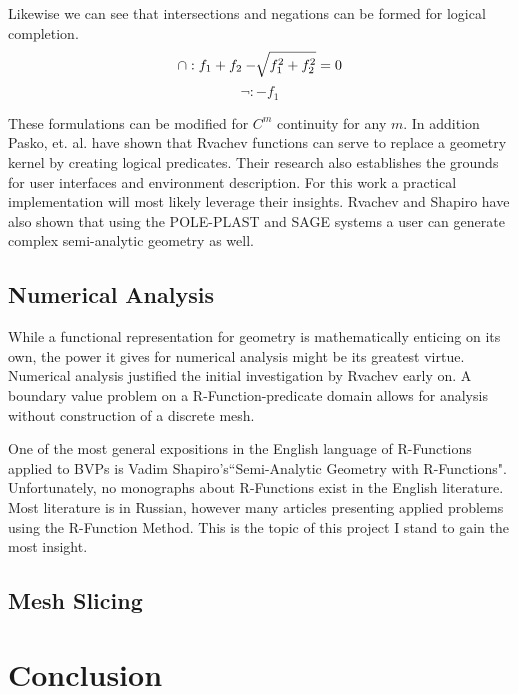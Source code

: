 \documentclass[a4paper]{article}
\begin{document}
Likewise we can see that intersections and negations can be formed for logical
completion.
\begin{equation*}
\cap : f_1 + f_2 - \sqrt[]{f_1^2 +f_2^2} =0 \\
\end{equation*}
\begin{equation*}
\neg : -f_1
\end{equation*}

These formulations can be modified for $C^m$ continuity for any $m$.
\cite{shapiro2007semi} In addition Pasko, et. al. have shown that Rvachev
functions can serve to replace a geometry kernel by creating logical
predicates. \cite{pasko1995function} Their research also establishes the
grounds for user interfaces and environment description. For this work a
practical implementation will most likely leverage their insights.
Rvachev and Shapiro have also shown that using the POLE-PLAST and SAGE
systems a user can generate complex semi-analytic geometry
as well.\cite{rvachev2000completeness} 
\subsection{Numerical Analysis}
While a functional representation for geometry is mathematically enticing on
its own, the power it gives for numerical analysis might be its greatest
virtue. Numerical analysis justified the initial investigation by Rvachev
early on. A boundary value problem on a R-Function-predicate domain allows
for analysis without construction of a discrete mesh.\cite{rvachev2000completeness}

One of the most general expositions in the English language of R-Functions
applied to BVPs is
Vadim Shapiro's``Semi-Analytic Geometry with R-Functions". \cite{shapiro2007semi}
Unfortunately, no monographs about R-Functions exist in the English literature.
Most literature is in Russian, however many articles presenting applied
problems using the R-Function Method. \cite{voron2010} This is the topic
of this project I stand to gain the most insight.


\subsection{Mesh Slicing}


\section{Conclusion}



\end{document}
